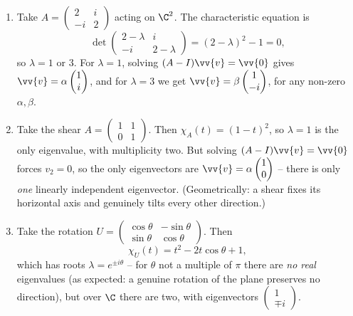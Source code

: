 \begin{example}
	\begin{enumerate}[label=(\roman*)]
		\item Take $A = \begin{pmatrix} 2 & i \\ -i & 2 \end{pmatrix}$ acting on $\C^2$. The characteristic equation is
		$$
		\det \begin{pmatrix} 2 - \lambda & i \\ -i & 2 - \lambda\end{pmatrix} = (2 - \lambda)^2 - 1 = 0,
		$$
		so $\lambda = 1$ or $3$. For $\lambda = 1$, solving $(A - I)\vv{v} = \vv{0}$ gives $\vv{v} = \alpha \begin{pmatrix}1 \\ i\end{pmatrix}$, and for $\lambda = 3$ we get $\vv{v} = \beta \begin{pmatrix}1 \\ -i\end{pmatrix}$, for any non-zero $\alpha, \beta$.
		\item Take the shear $A = \begin{pmatrix} 1 & 1 \\ 0 & 1\end{pmatrix}$. Then $\chi_A(t) = (1 - t)^2$, so $\lambda = 1$ is the only eigenvalue, with multiplicity two. But solving $(A - I)\vv{v} = \vv{0}$ forces $v_2 = 0$, so the only eigenvectors are $\vv{v} = \alpha\begin{pmatrix}1 \\ 0\end{pmatrix}$ -- there is only \emph{one} linearly independent eigenvector. (Geometrically: a shear fixes its horizontal axis and genuinely tilts every other direction.)
		\item Take the rotation $U = \begin{pmatrix} \cos \theta & -\sin\theta \\ \sin \theta & \cos\theta \end{pmatrix}$. Then
		$$
		\chi_U(t) = t^2 - 2t\cos\theta + 1,
		$$
		which has roots $\lambda = e^{\pm i \theta}$ -- for $\theta$ not a multiple of $\pi$ there are \emph{no real} eigenvalues (as expected: a genuine rotation of the plane preserves no direction), but over $\C$ there are two, with eigenvectors $\begin{pmatrix} 1 \\ \mp i\end{pmatrix}$.
	\end{enumerate}
\end{example}

